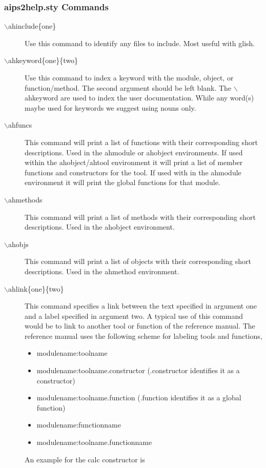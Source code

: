 \subsubsection{aips2help.sty Commands}

\begin{description}
\item[$\backslash$ahinclude\{one\}] Use this command to identify any files to include.
Most useful with glish.
%
\item[$\backslash$ahkeyword\{one\}\{two\}] Use this command to index a keyword with
the module, object, or function/method.  The second argument should
be left blank.
The $\backslash$ahkeyword are used to index the user documentation.  
 While any word(s) maybe used for keywords we suggest using nouns only.
%
\item[$\backslash$ahfuncs{}] This command will print a list of functions with their
corresponding short descriptions.  Used in the ahmodule or ahobject
environments.  
If used within the ahobject/ahtool environment it will print a list
of member functions and constructors for the tool.  If used with in the
ahmodule environment it will print the global functions for that
module.
%
\item[$\backslash$ahmethods{}]  This command will print a list of methods with their
corresponding short descriptions.  Used in the ahobject environment.
%
\item[$\backslash$ahobjs{}]  This command will print a list of objects with their
corresponding short descriptions.  Used in the ahmethod environment.
%
\item[$\backslash$ahlink\{one\}\{two\}] This command specifies a link between the
text specified in argument one and a label specified in argument two.  A typical use
of this command would be to link to another tool or function of the reference manual.
The reference manual uses the following scheme for labeling tools and functions,
\begin{itemize}
\item modulename:toolname
\item modulename:toolname.constructor (.constructor identifies it as a constructor)
\item modulename:toolname.function (.function identifies it as a global function)
\item modulename:functionname
\item modulename:toolname.functionname
\end{itemize}
An example for the calc constructor is

\end{description}
